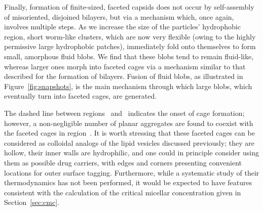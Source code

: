 Finally, formation of finite-sized, faceted capsids does not occur by self-assembly of  misoriented, disjoined bilayers, but via a mechanism which, once again,  involves multiple steps. 
As we increase the size of the particles' hydrophobic region, short worm-like clusters, which are now very flexible (owing to the highly permissive large hydrophobic patches), immediately fold onto themselves to form small, amorphous fluid blobs. 
We find that these blobs tend to remain fluid-like, whereas larger ones morph into faceted  cages via a mechanism similar to that described for the formation of bilayers.
Fusion of fluid blobs, as illustrated in Figure~\ref{fig:snapshots}, is the main mechanism through which large blobs, which eventually turn into  faceted cages, are generated.

The dashed line between regions~ and~ indicates the onset of cage formation; however, a non-negligible number of planar aggregates are found to coexist with the faceted cages in region~. 
It is worth stressing that these faceted cages can be considered as colloidal analogs of the lipid vesicles discussed previously; they are hollow,  their inner walls are hydrophilic, and one could in principle consider using them as possible drug carriers, with edges and corners presenting convenient locations for outer surface tagging.
Furthermore, while a systematic study of their thermodynamics has not been performed, it would be expected to have features consistent with the calculation of the critical micellar concentration given in Section~\ref{sec:cmc}.

